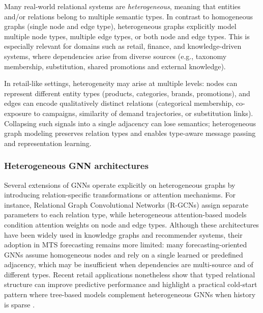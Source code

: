 Many real-world relational systems are \emph{heterogeneous}, meaning that entities and/or relations belong to multiple
semantic types. In contrast to homogeneous graphs (single node and edge type), heterogeneous graphs explicitly model
multiple node types, multiple edge types, or both node and edge types. This is especially relevant for domains such as retail, finance,
and knowledge-driven systems, where dependencies arise from diverse sources (e.g., taxonomy membership, substitution,
shared promotions and external knowledge).

In retail-like settings, heterogeneity may arise at multiple levels: nodes can represent different entity types
(products, categories, brands, promotions), and edges can encode qualitatively distinct relations (categorical
membership, co-exposure to campaigns, similarity of demand trajectories, or substitution links). Collapsing such
signals into a single adjacency can lose semantics; heterogeneous graph modeling preserves relation types and enables
type-aware message passing and representation learning.

\subsubsection{Heterogeneous GNN architectures}
Several extensions of GNNs operate explicitly on heterogeneous graphs by introducing relation-specific transformations
or attention mechanisms. For instance, Relational Graph Convolutional Networks (R-GCNs) assign separate parameters to
each relation type, while heterogeneous attention-based models condition attention weights on node and edge types.
Although these architectures have been widely used in knowledge graphs and recommender systems, their adoption in MTS
forecasting remains more limited: many forecasting-oriented GNNs assume homogeneous nodes and rely on a single learned
or predefined adjacency, which may be insufficient when dependencies are multi-source and of different types. Recent retail
applications nonetheless show that typed relational structure can improve predictive performance and highlight a
practical cold-start pattern where tree-based models complement heterogeneous GNNs when history is sparse
\cite{ma2024proactive_return_hgnn}.

